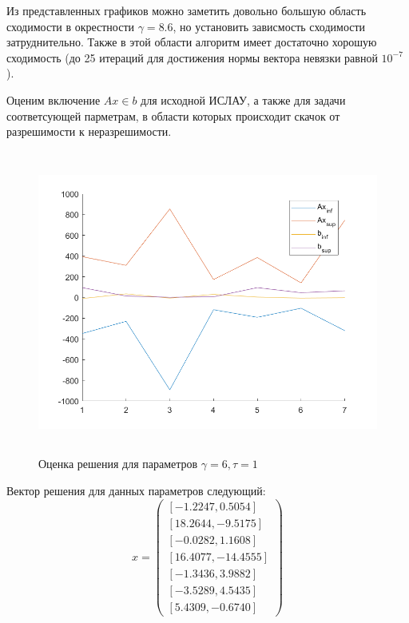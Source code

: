 \documentclass[12pt,a4paper]{scrartcl}
\begin{document}
Из представленных графиков можно заметить довольно большую область сходимости в окрестности $\gamma = 8.6$, но установить зависмость сходимости затруднительно. Также в этой области алгоритм имеет достаточно хорошую сходимость (до 25 итераций для достижения нормы вектора невязки равной $10^{-7}$).

Оценим включение $Ax \in b$ для исходной ИСЛАУ, а также для задачи соответсующей парметрам, в области которых происходит скачок от разрешимости к неразрешимости.

\begin{figure}[H]
    \centering
    \includegraphics[width=14cm, height=10cm]{fig/g6.png}
	\caption{Оценка решения для параметров $\gamma = 6, \tau=1$}
\end{figure}

Вектор решения для данных параметров следующий: 
\begin{equation}
x = \begin{pmatrix}
[-1.2247, 0.5054] \\
 [18.2644, -9.5175] \\
 [-0.0282, 1.1608] \\
 [16.4077, -14.4555] \\
 [-1.3436, 3.9882] \\
 [-3.5289, 4.5435] \\
 [5.4309, -0.6740]
\end{pmatrix}
\end{equation}
\end{document}
